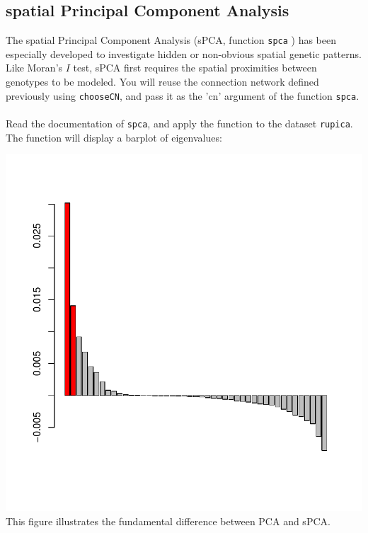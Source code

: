 \documentclass{article}
\begin{document}
\subsection{spatial Principal Component Analysis}

The spatial Principal Component Analysis (sPCA, function \texttt{spca} \cite{tjart04}) has been especially developed to
investigate hidden or non-obvious spatial genetic patterns.
Like Moran's $I$ test, sPCA first requires the spatial proximities between genotypes to be
modeled.
You will reuse the connection network defined previously using \texttt{chooseCN}, and pass it as the
'cn' argument of the function \texttt{spca}.
~\\

Read the documentation of \texttt{spca}, and apply the function to the dataset \texttt{rupica}.
The function will display a barplot of eigenvalues:
\begin{Schunk}
\end{Schunk}
\includegraphics{figs/spca-042}
This figure illustrates the fundamental difference between PCA and sPCA.
\end{document}
